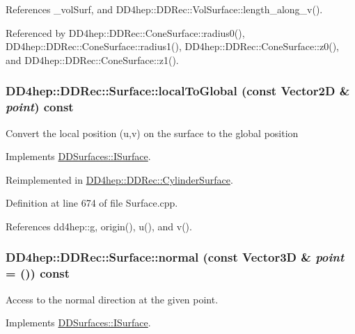 References \_\-volSurf, and DD4hep::DDRec::VolSurface::length\_\-along\_\-v().

Referenced by DD4hep::DDRec::ConeSurface::radius0(), DD4hep::DDRec::ConeSurface::radius1(), DD4hep::DDRec::ConeSurface::z0(), and DD4hep::DDRec::ConeSurface::z1().\hypertarget{class_d_d4hep_1_1_d_d_rec_1_1_surface_ad5107e6eed2e092460a69530258b4852}{
\subsubsection[{localToGlobal}]{ DD4hep::DDRec::Surface::localToGlobal (const {\bf Vector2D} \& {\em point}) const}}
\label{class_d_d4hep_1_1_d_d_rec_1_1_surface_ad5107e6eed2e092460a69530258b4852}
Convert the local position (u,v) on the surface to the global position 

Implements \hyperlink{class_d_d_surfaces_1_1_i_surface_a39651d79f7969ac7402a6e2cfc37803c}{DDSurfaces::ISurface}.

Reimplemented in \hyperlink{class_d_d4hep_1_1_d_d_rec_1_1_cylinder_surface_a175adc46f395f0795e4aad32147516fa}{DD4hep::DDRec::CylinderSurface}.

Definition at line 674 of file Surface.cpp.

References dd4hep::g, origin(), u(), and v().\hypertarget{class_d_d4hep_1_1_d_d_rec_1_1_surface_a1a4f7412be6079af165bb7a3b3e7770c}{
\subsubsection[{normal}]{ DD4hep::DDRec::Surface::normal (const {\bf Vector3D} \& {\em point} = {()}) const}}
\label{class_d_d4hep_1_1_d_d_rec_1_1_surface_a1a4f7412be6079af165bb7a3b3e7770c}


Access to the normal direction at the given point. 

Implements \hyperlink{class_d_d_surfaces_1_1_i_surface_abbead4b1af2864d6d3f61270543310a0}{DDSurfaces::ISurface}.


